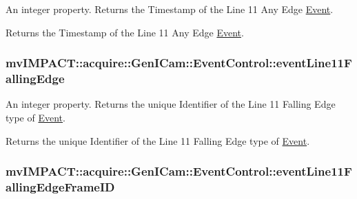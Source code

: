 An integer property. Returns the Timestamp of the Line 11 Any Edge \hyperlink{classmv_i_m_p_a_c_t_1_1acquire_1_1_event}{Event}. 

Returns the Timestamp of the Line 11 Any Edge \hyperlink{classmv_i_m_p_a_c_t_1_1acquire_1_1_event}{Event}. \hypertarget{classmv_i_m_p_a_c_t_1_1acquire_1_1_gen_i_cam_1_1_event_control_a864a9482476e0495511a1061fa2883f2}{
\subsubsection[{event\+Line11\+Falling\+Edge}]{ mv\+I\+M\+P\+A\+C\+T\+::acquire\+::\+Gen\+I\+Cam\+::\+Event\+Control\+::event\+Line11\+Falling\+Edge}}\label{classmv_i_m_p_a_c_t_1_1acquire_1_1_gen_i_cam_1_1_event_control_a864a9482476e0495511a1061fa2883f2}


An integer property. Returns the unique Identifier of the Line 11 Falling Edge type of \hyperlink{classmv_i_m_p_a_c_t_1_1acquire_1_1_event}{Event}. 

Returns the unique Identifier of the Line 11 Falling Edge type of \hyperlink{classmv_i_m_p_a_c_t_1_1acquire_1_1_event}{Event}. \hypertarget{classmv_i_m_p_a_c_t_1_1acquire_1_1_gen_i_cam_1_1_event_control_a8840700c93170ceca36a181bcdfc9fa3}{
\subsubsection[{event\+Line11\+Falling\+Edge\+Frame\+I\+D}]{ mv\+I\+M\+P\+A\+C\+T\+::acquire\+::\+Gen\+I\+Cam\+::\+Event\+Control\+::event\+Line11\+Falling\+Edge\+Frame\+I\+D}}\label{classmv_i_m_p_a_c_t_1_1acquire_1_1_gen_i_cam_1_1_event_control_a8840700c93170ceca36a181bcdfc9fa3}


